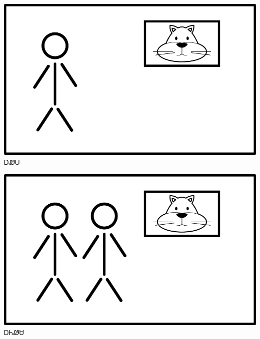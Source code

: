 \documentclass[avery8371]{flashcards}%
\begin{document}
    \begin{flashcard}{
        \includegraphics[width=0.95\columnwidth,height=.51\columnwidth,keepaspectratio]{../artwork/flags/awesa-flag}
    }
        \Huge ᎠᏪᏌ
    \end{flashcard}
    \begin{flashcard}{
        \includegraphics[width=0.95\columnwidth,height=.51\columnwidth,keepaspectratio]{../artwork/flags/aniwesa-flag}
    }
        \Huge ᎠᏂᏪᏌ
    \end{flashcard}
\end{document}
